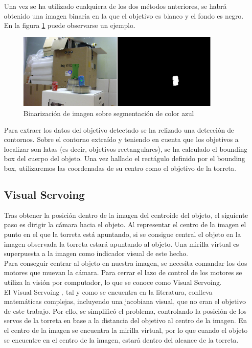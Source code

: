 Una vez se ha utilizado cualquiera de los dos métodos anteriores, se habrá obtenido una imagen binaria en la que el objetivo es blanco y el fondo es negro. En la figura \ref{binaria} puede observarse un ejemplo.\\

\begin{figure}[h]
\centering
\includegraphics[width=0.9\textwidth]{images/binaria}%
\caption{Binarización de imagen sobre segmentación de color azul}
\label{binaria}
\end{figure}
\FloatBarrier

Para extraer los datos del objetivo detectado se ha relizado una detección de contornos. Sobre el contorno extraído y teniendo en cuenta que los objetivos a localizar son latas (es decir, objetivos rectangulares), se ha calculado el bounding box del cuerpo del objeto. Una vez hallado el rectágulo definido por el bounding box, utilizaremos las coordenadas de su centro como el objetivo de la torreta.

\subsection{Visual Servoing}
Tras obtener la posición dentro de la imagen del centroide del objeto, el siguiente paso es dirigir la cámara hacia el objeto. Al representar el centro de la imagen el punto en el que la torreta está apuntando, si se consigue central el objeto en la imagen observada la torreta estará apuntando al objeto. Una mirilla virtual es superpuesta a la imagen como indicador visual de este hecho.\\

Para conseguir centrar al objeto en nuestra imagen, se necesita comandar los dos motores que muevan la cámara. Para cerrar el lazo de control de los motores se utiliza la visión por computador, lo que se conoce como Visual Servoing.\\

El Visual Servoing , tal y como se encuentra en la literatura, conlleva matemáticas complejas, incluyendo una jacobiana visual, que no eran el objetivo de este trabajo. Por ello, se simplificó el problema, controlando la posición de los servos de la torreta en base a la distancia del objetivo al centro de la imagen. En el centro de la imagen se encuentra la mirilla virtual, por lo que cuando el objeto se encuentre en el centro de la imagen, estará dentro del alcance de la torreta.\\

